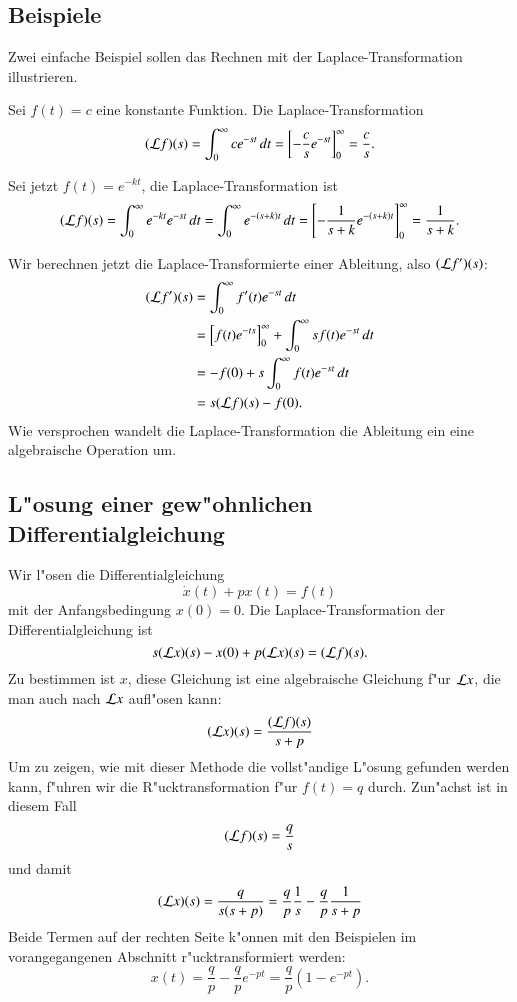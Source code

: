 \subsection{Beispiele}
Zwei einfache Beispiel sollen das Rechnen mit der Laplace-Transformation
illustrieren.

Sei $f(t)=c$ eine konstante Funktion. Die Laplace-Transformation
$$
({\cal L}f)(s)
=
\int_0^\infty ce^{-st}\,dt
=
\left[
-\frac{c}{s}e^{-st}
\right]_0^\infty=\frac{c}{s}.
$$

Sei jetzt $f(t)=e^{-kt}$, die Laplace-Transformation ist
$$
({\cal L}f)(s)=\int_0^\infty e^{-kt}e^{-st}\,dt
=\int_0^{\infty}e^{-(s+k)t}\,dt
=
\left[
- \frac1{s+k}e^{-(s+k)t}
\right]_0^\infty
=\frac1{s+k}.
$$

Wir berechnen jetzt die Laplace-Transformierte einer Ableitung, also
$({\cal L}f')(s)$:
\begin{align*}
({\cal L}f')(s)
&=
\int_0^\infty f'(t)e^{-st}\,dt
\\
&=
\left[f(t)e^{-ts}\right]_0^\infty
+
\int_0^\infty sf(t)e^{-st}\,dt
\\
&=
-f(0)+s\int_0^\infty f(t)e^{-st}\,dt
\\
&=s({\cal L}f)(s)-f(0).
\end{align*}
Wie versprochen wandelt die Laplace-Transformation die Ableitung
ein eine algebraische Operation um.

\subsection{L"osung einer gew"ohnlichen Differentialgleichung}
Wir l"osen die Differentialgleichung
$$
\dot x(t)+px(t)=f(t)
$$
mit der Anfangsbedingung $x(0)=0$.
Die Laplace-Transformation der Differentialgleichung ist
$$
s({\cal L}x)(s)-x(0)+p({\cal L}x)(s)=({\cal L}f)(s).
$$
Zu bestimmen ist $x$, diese Gleichung ist eine algebraische Gleichung
f"ur ${\cal L}x$, die man auch nach ${\cal L}x$ aufl"osen kann:
$$
({\cal L}x)(s)
=
\frac{({\cal L}f)(s)}{s+p}
$$
Um zu zeigen, wie mit dieser Methode die vollst"andige L"osung gefunden
werden kann, f"uhren wir die R"ucktransformation f"ur $f(t)=q$ durch.
Zun"achst ist in diesem Fall
$$
({\cal L}f)(s)=\frac{q}{s}
$$
und damit 
$$
({\cal L}x)(s)
=
\frac{q}{s(s+p)}=\frac{q}{p}\frac{1}{s}-\frac{q}{p}\frac{1}{s+p}
$$
Beide Termen auf der rechten Seite k"onnen mit den Beispielen im vorangegangenen
Abschnitt r"ucktransformiert werden:
$$
x(t)=\frac{q}{p}-\frac{q}{p}e^{-pt}=\frac{q}{p}(1-e^{-pt}).
$$

